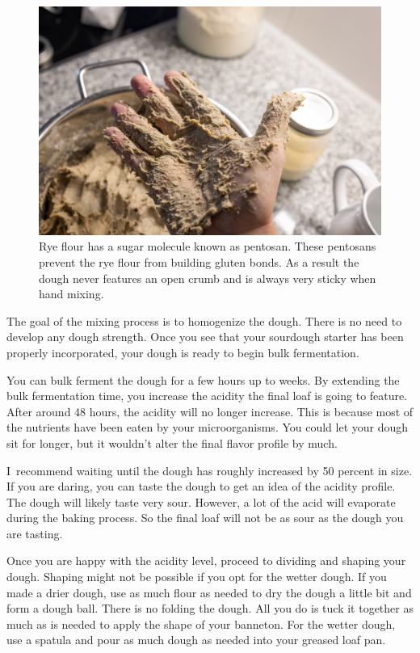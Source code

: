 \begin{figure}[!htb]
  \includegraphics[width=\textwidth]{sticky-hands}
  \caption{Rye flour has a sugar molecule known as pentosan. These pentosans prevent
  the rye flour from building gluten bonds. As a result the dough never features an
  open crumb and is always very sticky when hand mixing.}
  \label{fig:non-wheat-sticky-hands}
\end{figure}

The goal of the mixing process is to homogenize the dough. There
is no need to develop any dough strength. Once you see that
your sourdough starter has been properly incorporated, your
dough is ready to begin bulk fermentation.

You can bulk ferment the dough for a few hours up to
weeks. By extending the bulk fermentation time, you increase
the acidity the final loaf is going to feature. After around
48 hours, the acidity will no longer increase. This is because
most of the nutrients have been eaten by your microorganisms.
You could let your dough sit for longer, but it wouldn't alter the
final flavor profile by much.

I~recommend waiting until the dough has roughly increased by
50 percent in size. If you are daring, you can taste the dough
to get an idea of the acidity profile. The dough will likely
taste very sour. However, a lot of the acid will evaporate
during the baking process. So the final loaf will not be
as sour as the dough you are tasting.

Once you are happy with the acidity level, proceed to dividing
and shaping your dough. Shaping might not be possible if you opt
for the wetter dough. If you made a drier dough, use as much
flour as needed to dry the dough a little bit and form a dough ball.
There is no folding the dough. All you do is tuck it together
as much as is needed to apply the shape of your banneton.
For the wetter dough, use a spatula and pour as much dough as
needed into your greased loaf pan.

